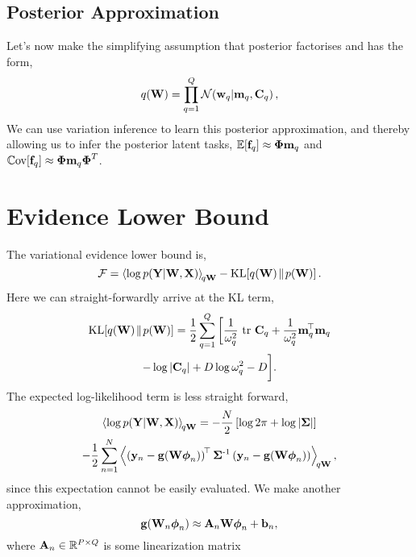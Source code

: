 \subsection{Posterior Approximation}
 Let's now make the simplifying assumption that posterior factorises and has the
form,
\begin{equation}
    \qrob{\Weights} = \prod^Q_{q=1} \gausC{\weights_q}{\pweights_q, \pocov_q},
\end{equation}
We can use variation inference to learn this posterior approximation, and
thereby allowing us to infer the posterior latent tasks,
$\expectation[\latents_q] \approx \Feats\pweights_q$ and 
$\covariance [\latents_q] \approx \Feats \pweights_q  \Feats^T$.
%
\section{Evidence Lower Bound}
The variational evidence lower bound is,
\begin{equation}
    \Fengy = \expec{q\Weights}{\log \probC{\Outs}{\Weights, \Ins}}
        - \KL{\qrob{\Weights}}{\prob{\Weights}}.
\end{equation}
Here we can straight-forwardly arrive at the KL term,
\begin{multline}
    \KL{\qrob{\Weights}}{\prob{\Weights}}  = 
        \frac{1}{2} \sum^\ltdim_{q=1}
        \bigg[
        \frac{1}{\prvar_q}\trace{\pocov_q}
        + \frac{1}{\prvar_q} \pweights_q\transpose\pweights_q \\
         - \log\deter{\pocov_q} + D \log \prvar_q - D
        \bigg].
    \label{eq:KL}
\end{multline}
%
The expected log-likelihood term is less straight forward,
\begin{multline}
    \expec{q\Weights}{\log \probC{\Outs}{\Weights, \Ins}}  = 
    - \frac{N}{2}
    \sbrac{\log{2\pi} + \log\deter{\Lcov}}  \\
     - \frac{1}{2} \sum^N_{n=1} \expec{q\Weights}{
        \brac{\outs_n - \nonlin{\Weights\feats_n}}\transpose\Lcov\inv
        \brac{\outs_n - \nonlin{\Weights\feats_n}}},
    \label{eq:ell_exact}
\end{multline}
since this expectation cannot be easily evaluated. We make another
approximation,
\begin{equation}
    \nonlin{\Weights_n\feats_n} \approx \Linmat_n \Weights\feats_n + \intcpt_n,
    \label{eq:linapprox}
\end{equation}
where $\Linmat_n \in \real{\otdim \times \ltdim}$ is some linearization matrix
